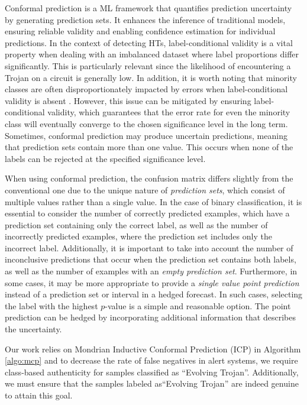 Conformal prediction \cite{shafer2008tutorial} is a ML framework that quantifies prediction uncertainty by generating prediction sets. It enhances the inference of traditional models, ensuring reliable validity and enabling confidence estimation for individual predictions. In the context of detecting HTs, label-conditional validity is a vital property when dealing with an imbalanced dataset where label proportions differ significantly. This is particularly relevant since the likelihood of encountering a Trojan on a circuit is generally low. In addition, it is worth noting that minority classes are often disproportionately impacted by errors when label-conditional validity is absent \cite{lofstrom2015bias}. However, this issue can be mitigated by ensuring label-conditional validity, which guarantees that the error rate for even the minority class will eventually converge to the chosen significance level in the long term. Sometimes, conformal prediction may produce uncertain predictions, meaning that prediction sets contain more than one value. This occurs when none of the labels can be rejected at the specified significance level.

When using conformal prediction, the confusion matrix differs slightly from the conventional one due to the unique nature of \textit{prediction sets}, which consist of multiple values rather than a single value. In the case of binary classification, it is essential to consider the number of correctly predicted examples, which have a prediction set containing only the correct label, as well as the number of incorrectly predicted examples, where the prediction set includes only the incorrect label. Additionally, it is important to take into account the number of inconclusive predictions that occur when the prediction set contains both labels, as well as the number of examples with an \textit{empty prediction set}. Furthermore, in some cases, it may be more appropriate to provide a \textit{single value point prediction} instead of a prediction set or interval in a hedged forecast. In such cases, selecting the label with the highest $p$-value is a simple and reasonable option. The point prediction can be hedged by incorporating additional information that describes the uncertainty.

Our work relies on Mondrian Inductive Conformal Prediction (ICP) \cite{bostrom2021mondrian} in Algorithm \ref{algo:mcp} and to decrease the rate of false negatives in alert systems, we require class-based authenticity for samples classified as ``Evolving Trojan''. Additionally, we must ensure that the samples labeled as``Evolving Trojan'' are indeed genuine to attain this goal.

